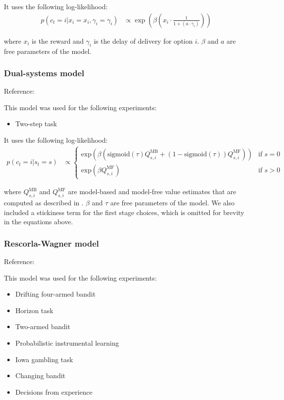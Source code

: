 \documentclass[pdflatex,sn-nature]{sn-jnl}%
\theoremstyle{thmstyleone}%
\theoremstyle{thmstyletwo}%
\theoremstyle{thmstylethree}%
\begin{document}
\noindent It uses the following log-likelihood:
\begin{align*}
    p(c_t = i | x_i = x_i, \gamma_i  =  \gamma_i) &\propto \exp\left(\beta\left( x_i \cdot \frac{1}{1+\left(a \cdot \gamma_i \right)}\right)\right)
\end{align*}

\noindent where $x_i$ is the reward and $\gamma_i$ is the delay of delivery for option $i$. $\beta$ and $a$ are free parameters of the model.

\subsubsection*{Dual-systems model}

Reference: \cite{daw2011model} 

\noindent This model was used for the following experiments:
\begin{itemize}
    \item Two-step task
\end{itemize}

\noindent It uses the following log-likelihood:
\begin{align*}
p(c_t = i | s_t = s) &\propto 
\begin{cases} 
       \text{exp} \left( \beta \left( \text{sigmoid}\left( \tau \right) Q_{s, i}^{\text{MB}}  + \left(1 - \text{sigmoid}\left( \tau \right)\right)    Q_{s, i}^{\text{MF}} \right) \right) & \text{if } s = 0 \\
        \text{exp} \left( \beta Q_{s, i}^{\text{MF}}\right)         & \text{if } s > 0
\end{cases} 
\end{align*}

\noindent where $Q_{s, i}^{\text{MB}}$ and $Q_{s, i}^{\text{MF}}$ are model-based and model-free value estimates that are computed as described in \cite{daw2011model}. $\beta$ and $\tau$ are free parameters of the model. We also included a stickiness term for the first stage choices, which is omitted for brevity in the equations above.

\subsubsection*{Rescorla-Wagner model}

Reference: \cite{wilson2014humans} 

\noindent This model was used for the following experiments:
\begin{itemize}
    \item Drifting four-armed bandit
    \item Horizon task
    \item Two-armed bandit
    \item Probabilistic instrumental learning
    \item Iowa gambling task
    \item Changing bandit
    \item Decisions from experience
\end{itemize}
\end{document}
